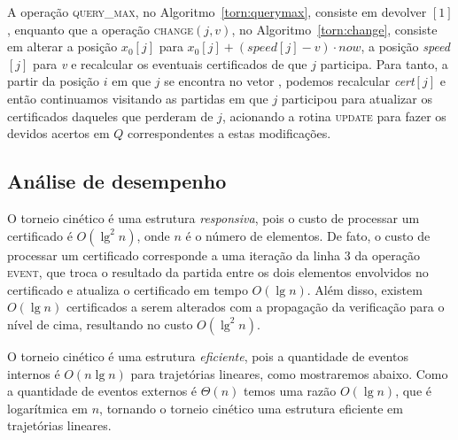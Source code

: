 



A operação \textsc{query\_max}, no Algoritmo~\ref{torn:querymax},
consiste em devolver \torneio$[1]$, enquanto que a operação \textsc{change}$(j, v)$, no
Algoritmo~\ref{torn:change}, consiste em alterar a posição $x_0[j]$ para ${x_0[j] +
(\mathit{speed}[j] - v)\cdot now}$, a posição \textit{speed}$[j]$ para \textit{v} e recalcular os
eventuais certificados de que $j$ participa.
Para tanto, a partir da posição $i$ em que $j$ se encontra no vetor \torneio, podemos recalcular
\textit{cert}$[j]$ e então continuamos visitando as partidas em que $j$ participou para atualizar
os certificados daqueles que perderam de $j$, acionando a rotina \textsc{update} para fazer os
devidos acertos em $Q$ correspondentes a estas modificações.









\FloatBarrier

\subsection{Análise de desempenho}\label{subsec:torneio:analise-de-desempenho}

O torneio cinético é uma estrutura \textit{responsiva}, pois o custo de
processar um certificado é $O(\lg^2{n})$, onde $n$ é o número de elementos.
De fato, o custo de processar um certificado corresponde a uma iteração da linha $3$ da operação
\textsc{event}, que troca o resultado da partida entre os dois elementos envolvidos no certificado
e atualiza o certificado em tempo $O(\lg{n})$.
Além disso, existem $O(\lg{n})$ certificados a serem alterados com a propagação da verificação
para o nível de cima, resultando no custo $O(\lg^2{n})$.

O torneio cinético é uma estrutura \textit{eficiente}, pois a quantidade de eventos internos é
$O(n\lg{n})$ para trajetórias lineares, como mostraremos abaixo.
Como a quantidade de eventos externos é $\Theta(n)$ temos uma razão $O(\lg{n})$, que é logarítmica
em $n$, tornando o torneio cinético uma estrutura eficiente em trajetórias lineares.

